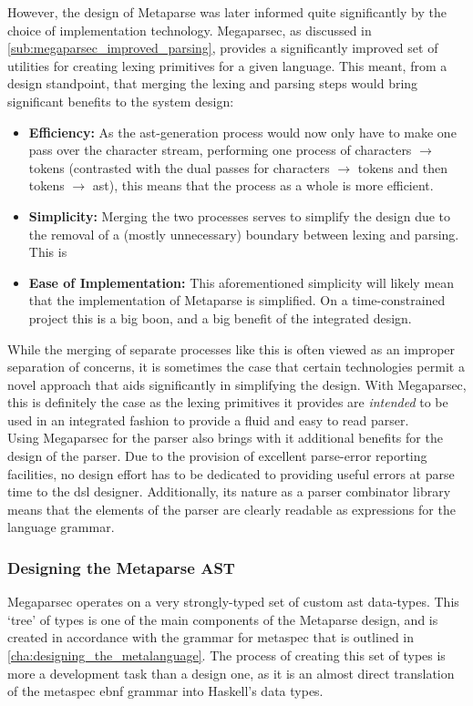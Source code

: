 However, the design of Metaparse was later informed quite significantly by the choice of implementation technology. 
Megaparsec, as discussed in \autoref{sub:megaparsec_improved_parsing}, provides a significantly improved set of utilities for creating lexing primitives for a given language. 
This meant, from a design standpoint, that merging the lexing and parsing steps would bring significant benefits to the system design:
\begin{itemize}
    \item \textbf{Efficiency:} As the \gls{ast}-generation process would now only have to make one pass over the character stream, performing one process of characters $\to$ tokens (contrasted with the dual passes for characters $\to$ tokens and then tokens $\to$ \gls{ast}), this means that the process as a whole is more efficient.
    \item \textbf{Simplicity:} Merging the two processes serves to simplify the design due to the removal of a (mostly unnecessary) boundary between lexing and parsing.
    This is 
    \item \textbf{Ease of Implementation:} This aforementioned simplicity will likely mean that the implementation of Metaparse is simplified.
    On a time-constrained project this is a big boon, and a big benefit of the integrated design.
\end{itemize}

While the merging of separate processes like this is often viewed as an improper separation of concerns, it is sometimes the case that certain technologies permit a novel approach that aids significantly in simplifying the design.
With Megaparsec, this is definitely the case as the lexing primitives it provides are \textit{intended} to be used in an integrated fashion to provide a fluid and easy to read parser. \\

Using Megaparsec for the parser also brings with it additional benefits for the design of the parser. 
Due to the provision of excellent parse-error reporting facilities, no design effort has to be dedicated to providing useful errors at parse time to the \gls{dsl} designer. 
Additionally, its nature as a parser combinator library means that the elements of the parser are clearly readable as expressions for the language grammar. 


\subsubsection{Designing the Metaparse AST} %
\label{ssub:designing_the_metaparse_ast}
Megaparsec operates on a very strongly-typed set of custom \gls{ast} data-types. 
This `tree' of types is one of the main components of the Metaparse design, and is created in accordance with the grammar for \gls{metaspec} that is outlined in \autoref{cha:designing_the_metalanguage}.
The process of creating this set of types is more a development task than a design one, as it is an almost direct translation of the \gls{metaspec} \gls{ebnf} grammar into Haskell's data types. \\

